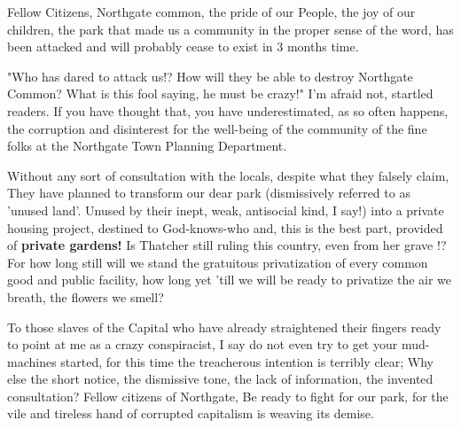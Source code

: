 \documentclass{article}
\date{\today}
\begin{document}
\maketitle
\begin{multicols}{3}
Fellow Citizens, Northgate common, the pride of our People, the joy of our
children, the park that made us a community in the proper sense of the word, has
been attacked and will probably cease to exist in 3 months time.

"Who has dared to attack us!?  How will they be able to destroy Northgate Common? What is this fool saying, he must be crazy!"
I'm afraid not, startled readers. If you have thought that, you have underestimated, as so often happens, the corruption
and disinterest for the well-being of the community of the fine folks at the Northgate Town Planning Department.

Without any sort of consultation with the locals, despite what they falsely claim, They have planned to transform our dear park
(dismissively referred to as 'unused land'. Unused by their inept, weak, antisocial kind, I say!) into a private housing project, 
destined to God-knows-who and, this is the best part, provided of \textbf{private gardens!} Is Thatcher still ruling this country, even from her grave !?
For how long still will we stand the gratuitous privatization of every common good and public facility, how long yet 'till we will be ready to privatize
the air we breath, the flowers we smell?

To those slaves of the Capital who have already straightened their fingers ready to point at me as a crazy conspiracist, 
I say do not even try to get your mud-machines started, for this time the treacherous intention is terribly clear;
Why else the short notice, the dismissive tone, the lack of information, the invented consultation?
Fellow citizens of Northgate,
Be ready to fight for our park, for the vile and tireless hand of corrupted capitalism is weaving its demise.
\closearticle
\end{multicols}
\end{document}
